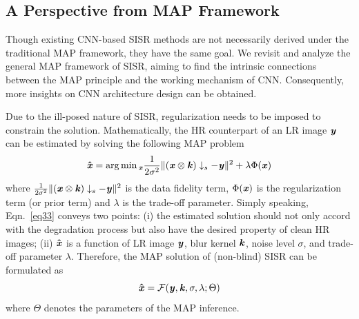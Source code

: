 \documentclass[10pt,twocolumn,letterpaper]{article}
\begin{document}
\subsection{A Perspective from MAP Framework}

Though existing CNN-based SISR methods are not necessarily derived under the traditional MAP framework, they have the same goal. We revisit and analyze the general MAP framework of SISR, aiming to find the intrinsic connections between the MAP principle and the working mechanism of CNN. Consequently, more insights on CNN architecture design can be obtained.

Due to the ill-posed nature of SISR, regularization needs to be imposed to constrain the solution.
Mathematically, the HR counterpart of an LR image $\textbf{\emph{y}}$ can be estimated by solving the following MAP problem
\begin{equation}\label{eq33}
 \boldsymbol{\hat{\textbf{\emph{x}}}} = \mathop{\arg\min}\displaystyle_{\textbf{\emph{x}}}\frac{1}{2\sigma^2}\|(\textbf{\emph{x}} \otimes \textbf{\emph{k}})\downarrow_s-\textbf{\emph{y}}\|^2  + \lambda \Phi(\textbf{\emph{x}})
\end{equation}
where $\frac{1}{2\sigma^2}\|(\textbf{\emph{x}} \otimes \textbf{\emph{k}})\downarrow_s-\textbf{\emph{y}}\|^2$ is the data fidelity term, $\Phi(\textbf{\emph{x}})$ is the
regularization term (or prior term) and $\lambda$ is the trade-off parameter.
Simply speaking, Eqn.~\eqref{eq33} conveys two points: (i) the estimated solution should not only accord with the degradation process but also have the desired property of clean HR images; (ii)
$\boldsymbol{\hat{\textbf{\emph{x}}}}$ is a function of LR image $\textbf{\emph{y}}$, blur kernel $\textbf{\emph{k}}$, noise level $\sigma$, and trade-off parameter $\lambda$.
Therefore, the MAP solution of (non-blind) SISR can be formulated as
\begin{equation}\label{eq4}
 \boldsymbol{\hat{\textbf{\emph{x}}}} = \mathcal{F}(\textbf{\emph{y}}, \textbf{\emph{k}},\sigma, \lambda; \Theta)
\end{equation}
where $\Theta$ denotes the parameters of the MAP inference.
\end{document}
